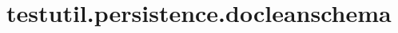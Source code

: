 \section{testutil.persistence.docleanschema}
\label{configuration:TestutilPersistenceDocleanschema}
\TODO
